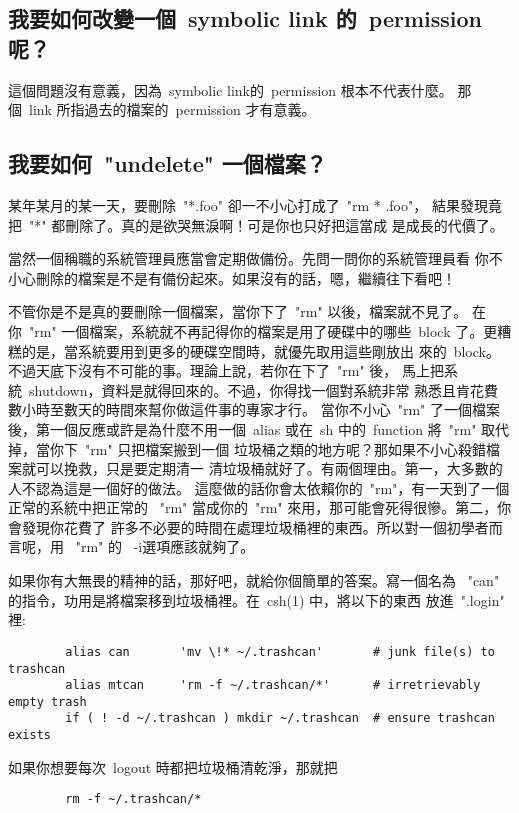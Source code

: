 \documentclass{article}
\begin{document}
\begin{CJK*}{Bg5}{ming}
\subsection{我要如何改變一個~symbolic link 的~permission 呢？}

	這個問題沒有意義，因為~symbolic link的~permission 根本不代表什麼。
	那個~link 所指過去的檔案的~permission 才有意義。

\subsection{我要如何~"undelete" 一個檔案？}

	某年某月的某一天，要刪除~"*.foo" 卻一不小心打成了~"rm * .foo"，
	結果發現竟把~"*" 都刪除了。真的是欲哭無淚啊！可是你也只好把這當成
	是成長的代價了。

	當然一個稱職的系統管理員應當會定期做備份。先問一問你的系統管理員看
	你不小心刪除的檔案是不是有備份起來。如果沒有的話，嗯，繼續往下看吧！

	不管你是不是真的要刪除一個檔案，當你下了~"rm" 以後，檔案就不見了。
	在你~"rm" 一個檔案，系統就不再記得你的檔案是用了硬碟中的哪些~block 
	了。更糟糕的是，當系統要用到更多的硬碟空間時，就優先取用這些剛放出
	來的~block。不過天底下沒有不可能的事。理論上說，若你在下了~"rm" 後，
	馬上把系統~shutdown，資料是就得回來的。不過，你得找一個對系統非常
	熟悉且肯花費數小時至數天的時間來幫你做這件事的專家才行。
	當你不小心~"rm" 了一個檔案後，第一個反應或許是為什麼不用一個~alias 
	或在~sh 中的~function 將~"rm"  取代掉，當你下~"rm" 只把檔案搬到一個
	垃圾桶之類的地方呢？那如果不小心殺錯檔案就可以挽救，只是要定期清一
	清垃圾桶就好了。有兩個理由。第一，大多數的人不認為這是一個好的做法。
	這麼做的話你會太依賴你的~"rm"，有一天到了一個正常的系統中把正常的 
	~"rm" 當成你的~"rm" 來用，那可能會死得很慘。第二，你會發現你花費了
	許多不必要的時間在處理垃圾桶裡的東西。所以對一個初學者而言呢，用 
	~"rm" 的 ~-i選項應該就夠了。

	如果你有大無畏的精神的話，那好吧，就給你個簡單的答案。寫一個名為 
	~"can" 的指令，功用是將檔案移到垃圾桶裡。在~csh(1) 中，將以下的東西
	放進~".login" 裡:
\footnotesize
\begin{verbatim}
        alias can       'mv \!* ~/.trashcan'       # junk file(s) to trashcan
        alias mtcan     'rm -f ~/.trashcan/*'      # irretrievably empty trash
        if ( ! -d ~/.trashcan ) mkdir ~/.trashcan  # ensure trashcan exists
\end{verbatim}
\normalsize
	如果你想要每次~logout 時都把垃圾桶清乾淨，那就把
\begin{verbatim}
        rm -f ~/.trashcan/*
\end{verbatim}


\end{CJK*}
\end{document}
